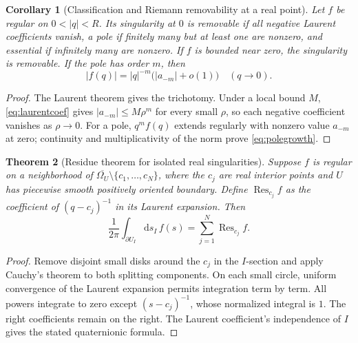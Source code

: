 \documentclass[11pt,a4paper]{article}
\numberwithin{equation}{section}
\newtheorem{theorem}{Theorem}[section]
\newtheorem{corollary}[theorem]{Corollary}
\theoremstyle{definition}
\theoremstyle{remark}
\newcommand{\Res}{\operatorname{Res}}
\begin{document}
\begin{corollary}[Classification and Riemann removability at a real point]
\label{cor:removable-slice}
Let $f$ be regular on $0<|q|<R$. Its singularity at $0$ is removable if
all negative Laurent coefficients vanish, a pole if finitely many but at
least one are nonzero, and essential if infinitely many are nonzero.
If $f$ is bounded near zero, the singularity is removable. If the pole has
order $m$, then
\begin{equation}
 |f(q)|=|q|^{-m}\bigl(|a_{-m}|+o(1)\bigr)\quad(q\to0).
 \label{eq:polegrowth}
\end{equation}
\end{corollary}
\begin{proof}
The Laurent theorem gives the trichotomy. Under a local bound $M$,
\eqref{eq:laurentcoef} gives $|a_{-m}|\le M\rho^m$ for every small $\rho$,
so each negative coefficient vanishes as $\rho\to0$.
For a pole, $q^m f(q)$ extends regularly with nonzero value $a_{-m}$ at
zero; continuity and multiplicativity of the norm prove \eqref{eq:polegrowth}.
\end{proof}

\begin{theorem}[Residue theorem for isolated real singularities]
\label{thm:residue-slice}
Suppose $f$ is regular on a neighborhood of
$\overline{\Omega_U}\setminus\{c_1,\ldots,c_N\}$, where the $c_j$ are
real interior points and $U$ has piecewise smooth positively oriented
boundary. Define $\Res_{c_j}f$ as the coefficient of $(q-c_j)^{-1}$ in its
Laurent expansion. Then
\begin{equation}
 \frac1{2\pi}\int_{\partial U_I}\mathrm ds_I\,f(s)
     =\sum_{j=1}^N\Res_{c_j}f.
 \label{eq:residue-slice}
\end{equation}
\end{theorem}
\begin{proof}
Remove disjoint small disks around the $c_j$ in the $I$-section and apply
Cauchy's theorem to both splitting components. On each small circle,
uniform convergence of the Laurent expansion permits integration term by
term. All powers integrate to zero except $(s-c_j)^{-1}$, whose normalized
integral is $1$. The right coefficients remain on the right. The Laurent
coefficient's independence of $I$ gives the stated quaternionic formula.
\end{proof}
\end{document}
